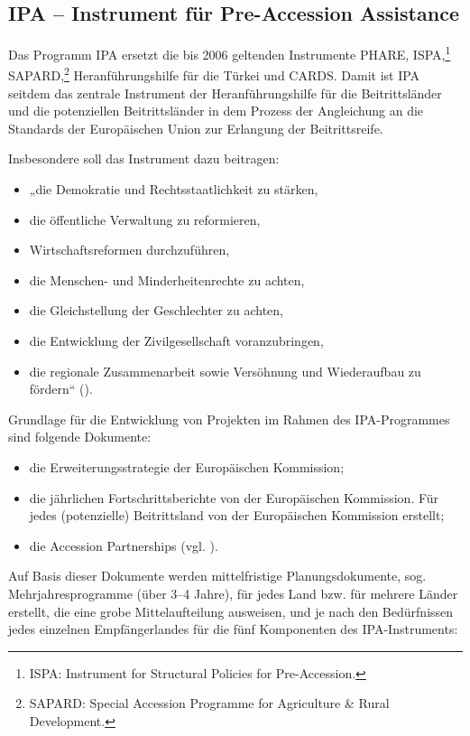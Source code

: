 \subsection{IPA – Instrument für Pre-Accession Assistance}
Das Programm IPA ersetzt die bis 2006 geltenden Instrumente PHARE, ISPA,\footnote{ISPA: Instrument for Structural Policies for Pre-Accession.} SAPARD,\footnote{SAPARD: Special Accession Programme for Agriculture \& Rural Development.} Heranführungshilfe für die Türkei und CARDS. Damit ist IPA seitdem das zentrale Instrument der Heranführungshilfe für die Beitrittsländer und die potenziellen Beitrittsländer in dem Prozess der Angleichung an die Standards der Europäischen Union zur Erlangung der Beitrittsreife.\par

Insbesondere soll das Instrument dazu beitragen:
\begin{itemize} \itemsep1pt \parskip0pt 
\item „die Demokratie und Rechtsstaatlichkeit zu stärken,
\item die öffentliche Verwaltung zu reformieren,
\item Wirtschaftsreformen durchzuführen,
\item die Menschen- und Minderheitenrechte zu achten,
\item die Gleichstellung der Geschlechter zu achten,
\item die Entwicklung der Zivilgesellschaft voranzubringen,
\item die regionale Zusammenarbeit sowie Versöhnung und Wiederaufbau zu fördern“ (\cite{senatskanzlei}). 
\end{itemize}
Grundlage für die Entwicklung von Projekten im Rahmen des IPA-Programmes sind folgende Dokumente:
\begin{itemize} \itemsep1pt \parskip0pt 
\item die Erweiterungsstrategie der Europäischen Kommission;
\item die jährlichen Fortschrittsberichte von der Europäischen Kommission. Für jedes (potenzielle) Beitrittsland von der Europäischen Kommission erstellt;
\item die Accession Partnerships (vgl. \cite{eurcom11a}).
\end{itemize}
Auf Basis dieser Dokumente werden mittelfristige Planungsdokumente, sog. Mehrjahresprogramme (über 3–4 Jahre), für jedes Land bzw. für mehrere Länder erstellt, die eine grobe Mittelaufteilung ausweisen, und je nach den Bedürfnissen jedes einzelnen Empfängerlandes für die fünf Komponenten des IPA-Instruments:
